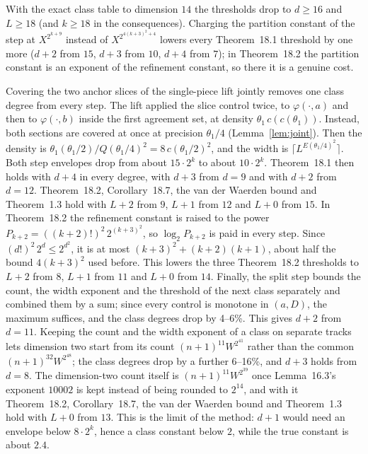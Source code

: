 \documentclass[11pt]{article}
\theoremstyle{definition}
\theoremstyle{remark}
\begin{document}
With the exact class table to dimension $14$ the thresholds drop to
$d\ge16$ and $L\ge18$ (and $k\ge18$ in the consequences). Charging the partition constant of the
step at $X^{2^{k+9}}$ instead of $X^{2^{4(k+3)^2+4}}$ lowers every Theorem~18.1
threshold by one more ($d+2$ from $15$, $d+3$ from $10$, $d+4$ from $7$); in
Theorem~18.2 the partition constant is an exponent of the refinement constant,
so there it is a genuine cost.

Covering the two anchor slices of the single-piece lift jointly removes one
class degree from every step. The lift applied the slice control twice,
to $\varphi(\cdot,a)$ and then to $\varphi(\cdot,b)$ inside the first
agreement set, at density $\theta_1\,c(c(\theta_1))$. Instead, both sections
are covered at once at precision $\theta_1/4$ (Lemma~\ref{lem:joint}). Then
the density is $\theta_1(\theta_1/2)/Q(\theta_1/4)^2=8\,c(\theta_1/2)^2$, and
the width is $\lceil L^{E(\theta_1/4)^2}\rceil$. Both step envelopes drop from
about $15\cdot2^k$ to about $10\cdot2^k$. Theorem~18.1 then holds with $d+4$
in every degree, with $d+3$ from $d=9$ and with $d+2$ from $d=12$. Theorem~18.2,
Corollary~18.7, the van der Waerden bound and Theorem~1.3 hold with $L+2$ from
$9$, $L+1$ from $12$ and $L+0$ from $15$. In Theorem~18.2 the refinement
constant is raised to the power $P_{k+2}=((k+2)!)^2\,2^{(k+3)^2}$, so
$\log_2P_{k+2}$ is paid in every step. Since $(d!)^2\,2^d\le2^{d^2}$, it is
at most $(k+3)^2+(k+2)(k+1)$, about half the bound $4(k+3)^2$ used before.
This lowers the three Theorem~18.2 thresholds to $L+2$ from $8$, $L+1$ from
$11$ and $L+0$ from $14$. Finally, the split step bounds the count, the
width exponent and the threshold of the next class separately and combined
them by a sum; since every control is monotone in $(a,D)$, the maximum
suffices, and the class degrees drop by 4--6\%. This gives $d+2$ from
$d=11$. Keeping the count and the width exponent of a class on separate
tracks lets dimension two start from its count $(n+1)^{11}W^{2^{41}}$ rather
than the common $(n+1)^{32}W^{2^{48}}$; the class degrees drop by a further
6--16\%, and $d+3$ holds from $d=8$. The dimension-two count itself is
$(n+1)^{11}W^{2^{39}}$ once Lemma~16.3's exponent $10002$ is kept instead
of being rounded to $2^{14}$, and with it Theorem~18.2, Corollary~18.7,
the van der Waerden bound and Theorem~1.3 hold with $L+0$ from $13$. This is the limit of the method:
$d+1$ would need an envelope below $8\cdot2^k$, hence a class constant
below $2$, while the true constant is about $2.4$.
\end{document}
